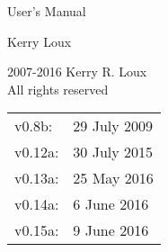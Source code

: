 \documentclass[oneside]{memoir}
\begin{document}
\frontmatter
{}%
\pagestyle{empty}

\vspace*{\fill}
\begin{center}
\HUGE\textsf{\VVASE{}}\par
\end{center}

\begin{center}
\Huge\textsf{User's Manual}\par
\end{center}

\begin{center}
\LARGE\textsf{Kerry Loux}\par
\medskip
\normalsize\textsf{\version}\par
\end{center}
\vspace*{\fill}

\clearpage



\begingroup
\footnotesize
\setlength{\parindent}{0pt}
\setlength{\parskip}{\baselineskip}
\textcopyright{} 2007-2016 Kerry R. Loux \\
All rights reserved

\begin{center}
\begin{tabular}{ll}
v0.8b:   & 29 July 2009 \\
v0.12a:  & 30 July 2015 \\
v0.13a:  & 25 May 2016 \\
v0.14a:  & 6 June 2016 \\
v0.15a:  & 9 June 2016 \\
\end{tabular}
\end{center}
\endgroup

\clearpage

\pagestyle{headings}

\tableofcontents
\setlength{\unitlength}{1pt}
\clearpage

\pagestyle{ruled}




\mainmatter






\end{document}
